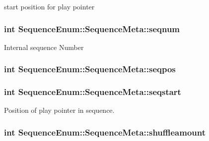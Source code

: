 start position for play pointer 

\hypertarget{structSequenceEnum_1_1SequenceMeta_aeaa7178f934040cf56cde8520d50d5ae}{
\subsubsection[{seqnum}]{\setlength{\rightskip}{0pt plus 5cm}int Sequence\-Enum\-::\-Sequence\-Meta\-::seqnum}}\label{structSequenceEnum_1_1SequenceMeta_aeaa7178f934040cf56cde8520d50d5ae}
Internal sequence Number \hypertarget{structSequenceEnum_1_1SequenceMeta_a4592f8f35b0dc3633cf0b8d233ad9b6e}{
\subsubsection[{seqpos}]{\setlength{\rightskip}{0pt plus 5cm}int Sequence\-Enum\-::\-Sequence\-Meta\-::seqpos}}\label{structSequenceEnum_1_1SequenceMeta_a4592f8f35b0dc3633cf0b8d233ad9b6e}
\hypertarget{structSequenceEnum_1_1SequenceMeta_af53e20202a4cb12d68c8d872144503c2}{
\subsubsection[{seqstart}]{\setlength{\rightskip}{0pt plus 5cm}int Sequence\-Enum\-::\-Sequence\-Meta\-::seqstart}}\label{structSequenceEnum_1_1SequenceMeta_af53e20202a4cb12d68c8d872144503c2}


Position of play pointer in sequence. 

\hypertarget{structSequenceEnum_1_1SequenceMeta_a368101eef07df62d77a16bd2715f7d19}{
\subsubsection[{shuffleamount}]{\setlength{\rightskip}{0pt plus 5cm}int Sequence\-Enum\-::\-Sequence\-Meta\-::shuffleamount}}\label{structSequenceEnum_1_1SequenceMeta_a368101eef07df62d77a16bd2715f7d19}


